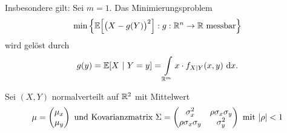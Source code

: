 Insbesondere gilt: Sei $m=1$. Das Minimierungsproblem 
\begin{align*}
	\min\left\lbrace\E\Big[\big(X-g(Y)\big)^2\Big]:g:\R^n\to\R\text{  messbar}\right\rbrace
\end{align*}
wird gelöst durch
\begin{align*}
	g(y)=\E[X~|~Y=y]=\int\limits_{\R^m} x\cdot f_{X|Y}(x,y)\d x.
\end{align*}

\begin{beisp}
	Sei $(X,Y)$ normalverteilt auf $\R^2$ mit Mittelwert
	\begin{align*}
		\mu=\begin{pmatrix}
		\mu_x\\ \mu_y
		\end{pmatrix}\text{ und Kovarianzmatrix }
		\Sigma=\begin{pmatrix}
		\sigma_x^2 & \rho\sigma_x\sigma_y\\
		\rho\sigma_x\sigma_y & \sigma_y^2
		\end{pmatrix}\mit|\rho|<1
	\end{align*}
	

\end{beisp}
